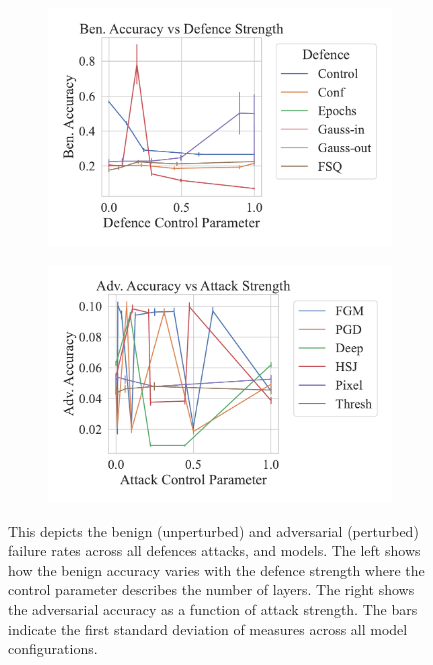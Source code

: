 \begin{figure}[!h]
    \centering
    \begin{subfigure}
        \centering
        \includegraphics[trim={0 10pt 0 10pt},clip,width=.45\textwidth]{plots/def_param_vs_accuracy.pdf}
    \end{subfigure}
    \begin{subfigure}
        \centering
        \includegraphics[trim={0 10pt 0 10pt},clip,width=.45\textwidth]{plots/atk_param_vs_accuracy.pdf}
    \end{subfigure}
    \caption{This depicts the benign (unperturbed) and adversarial (perturbed) failure rates across all defences attacks, and models. The left shows how the benign accuracy varies with the defence strength where the control parameter describes the number of layers. The right shows the adversarial accuracy as a function of attack strength. The bars indicate the first standard deviation of measures across all model configurations.}
    \label{fig:strength}
\end{figure}


